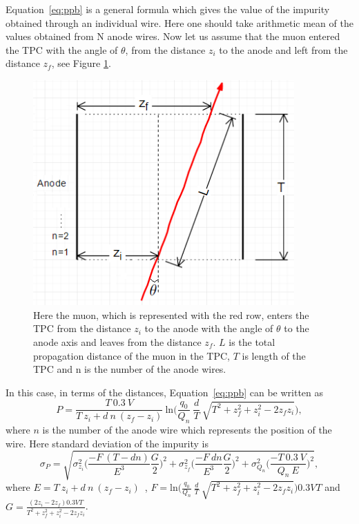 \documentclass[a4paper]{article}\linespread{1.4}
\begin{document}
Equation~\ref{eq:ppb} is a general formula which gives the value of the impurity obtained through an individual wire. Here one should take arithmetic mean of the values obtained from N anode wires.
Now let us assume that the muon entered the TPC with the angle of $\theta$, from the distance $z_{i}$ to the anode and left from the distance $z_{f}$, see Figure \ref{fig:sich}.
\begin{figure}[] \centering \includegraphics[width=100mm,scale=1.0]{sich.png} \caption{Here the muon, which is represented with the red row, enters the TPC from the distance $z_{i}$ to the anode with the angle of $\theta$ to the anode axis and leaves from the distance $z_{f}$.  $L$ is the total propagation distance of the muon in the TPC, $T$ is length of the TPC and n is the number of the anode wires.} \label{fig:sich} \end{figure}  
In this case, in terms of the distances, Equation~\ref{eq:ppb} can be written as
\begin{equation} P= \frac{T~0.3~V}{T~z_{i}+d~n~(z_{f}-z_{i})}~\mathrm{ln}\Big(\frac{q_{0}}{Q_{n}}~\frac{d}{T}~\sqrt{T^{2}+z_{f}^{2}+z_{i}^{2}-2z_{f}z_{i}}\Big),\label{eq:ppbs}\end{equation} 
where $n$ is the number of the anode wire which represents the position of the wire. Here standard deviation of the impurity is
\begin{equation} \sigma_{P}= \sqrt{\sigma_{z_{i}}^2 \Big( \frac{-F~(T-dn)}{E^3} \frac{G}{2} \Big)^2 + \sigma_{z_{f}}^2 \Big( \frac{-F~dn}{E^3} \frac{G}{2} \Big)^2 + \sigma_{Q_{n}}^2 \Big( \frac{-T\ 0.3\ V}{Q_{n}\ E} \Big)^2}, \label{eq:432}\end{equation} 
where $E=T~z_{i}+d~n~(z_{f}-z_{i})$~, $F=\mathrm{ln}\Big(\frac{q_{0}}{Q_{n}}~\frac{d}{T}~\sqrt{T^{2}+z_{f}^{2}+z_{i}^{2}-2z_{f}z_{i}}\Big) 0.3 V T$ and $G=\frac{(2z_{i}-2z_{f})0.3 V T}{T^{2}+z_{f}^{2}+z_{i}^{2}-2z_{f}z_{i}}$.
\end{document}
